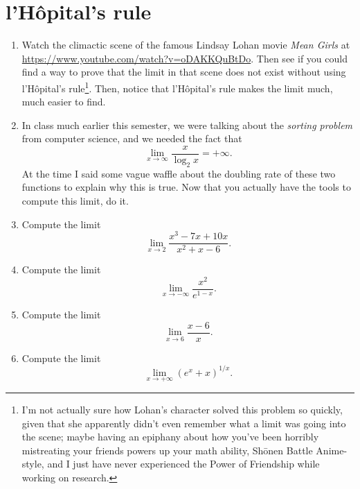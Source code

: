 \documentclass[reqno,12pt,letterpaper]{amsart}
\theoremstyle{definition}
\numberwithin{equation}{section}
\begin{document}
\section{l'H\^opital's rule}
\begin{enumerate}
\item Watch the climactic scene of the famous Lindsay Lohan movie \emph{Mean Girls} at \url{https://www.youtube.com/watch?v=oDAKKQuBtDo}.
Then see if you could find a way to prove that the limit in that scene does not exist without using l'H\^opital's rule\footnote{I'm not actually sure how Lohan's character solved this problem so quickly, given that she apparently didn't even remember what a limit was going into the scene; maybe having an epiphany about how you've been horribly mistreating your friends powers up your math ability, Sh\=onen Battle Anime-style, and I just have never experienced the Power of Friendship while working on research.}.
Then, notice that l'H\^opital's rule makes the limit much, much easier to find.
\item In class much earlier this semester, we were talking about the \emph{sorting problem} from computer science, and we needed the fact that
$$\lim_{x \to \infty} \frac{x}{\log_2 x} = + \infty.$$
At the time I said some vague waffle about the doubling rate of these two functions to explain why this is true.
Now that you actually have the tools to compute this limit, do it.
\item Compute the limit
$$\lim_{x \to 2} \frac{x^3 - 7x + 10x}{x^2 + x - 6}.$$
\item Compute the limit
$$\lim_{x \to -\infty} \frac{x^2}{e^{1 - x}}.$$
\item Compute the limit
$$\lim_{x \to 6} \frac{x - 6}{x}.$$
\item Compute the limit
$$\lim_{x \to +\infty} (e^x + x)^{1/x}.$$
\end{enumerate}
\end{document}
